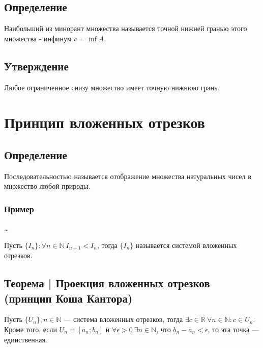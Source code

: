 \documentclass{article}
\begin{document}
\subsection{Определение}
Наибольший из минорант множества называется точной нижней гранью этого множества - инфинум $c = \inf A$.


\subsection{Утверждение}
Любое ограниченное снизу множество имеет точную нижнюю грань.



\section{Принцип вложенных отрезков}

\subsection{Определение}
Последовательностью называется отображение множества натуральных чисел в множество любой природы.

\subsubsection{Пример} 
\dots

Пусть $\{I_n\}: \forall n \in \mathbb{N} ~ I_{n+1} < I_n$, тогда $\{I_n\}$ называется системой вложенных отрезков.


\subsection{Теорема | Проекция вложенных отрезков (принцип Коша Кантора)}
Пусть $\{U_n\}, n \in \mathbb{N}$ --- система вложенных отрезков, тогда $\exists c \in \mathbb{R} ~ \forall n \in \mathbb{N}: c \in U_n$. \\
Кроме того, если $U_n = [a_n ; b_n]$ и $\forall \epsilon > 0 ~ \exists n \in \mathbb{N}$, что $b_n - a_n < \epsilon$, то эта точка --- единственная.
\end{document}
